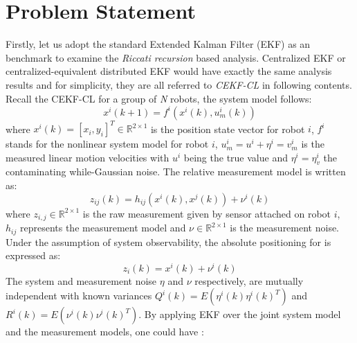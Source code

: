 \documentclass[conference]{IEEEtran}
\begin{document}
\section{Problem Statement}
Firstly, let us adopt the standard Extended Kalman Filter (EKF) as an benchmark to examine the \emph{Riccati recursion} based analysis.
Centralized EKF or centralized-equivalent distributed EKF \cite{roumeliotis2002distributed,kia2014centralizedequivalent,kia2016cooperative,kia2018serverassisted,luft2018recursive} would have exactly the same analysis results and for simplicity, they are all referred to \emph{CEKF-CL} in following contents.
Recall the CEKF-CL for a group of \emph{N} robots, the system model follows:
\begin{equation}
	x^i(k+1) = f^i(x^i(k),u^i_m(k))
	\label{equ::CEKF_sys}
\end{equation}
where $x^i(k) = [x_i,y_i]^T\in \mathbb{R}^{2\times1}$ is the position state vector for robot $i$, $f^i$ stands for the nonlinear system model for robot $i$, $u^i_m = u^i + \eta^i =v^i_m$ is the measured linear motion velocities with $u^i$ being the true value and $\eta^i = \eta^i_v$ the contaminating while-Gaussian noise.
The relative measurement model is written as:
\begin{equation}
	z_{ij}(k) = h_{ij}(x^i(k),x^j(k)) + \nu^i(k)
	\label{equ::CEKF_mea_rel}
\end{equation}
where $z_{i,j} \in \mathbb{R}^{2\times1}$ is the raw measurement given by sensor attached on robot $i$, $h_{ij}$ represents the measurement model and $\nu \in \mathbb{R}^{2\times1}$ is the measurement noise.
Under the assumption of system observability, the absolute positioning for is expressed as:
\begin{equation}
	z_{i}(k) = x^i(k) + \nu^i(k)
	\label{equ::CEKF_mea_abs}
\end{equation}
The system and measurement noise $\eta$ and $\nu$ respectively, are mutually independent with known variances $Q^i(k) =E(\eta^i(k)\eta^i(k)^T)$ and $R^i(k)=E(\nu^i(k)\nu^i(k)^T)$. By applying EKF over the joint system model and the measurement models, one could have \cite{kia2014centralizedequivalent,kia2018serverassisted}:
\end{document}
